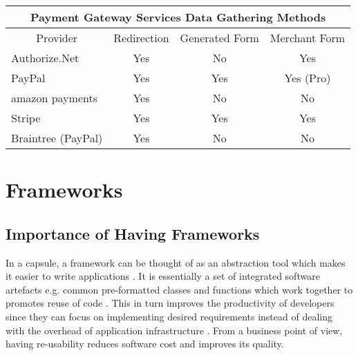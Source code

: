 \begin{center}
\begin{tabular}{ |p{3.5cm}|p{1.75cm}|p{2cm}|p{2cm}|  }
 \hline
 	\multicolumn{4}{|c|}{Payment Gateway Services Data Gathering Methods} \\
 \hline
 	\multicolumn{1}{|c|}{Provider} &
 	\multicolumn{1}{|c|}{Redirection} &
 	\multicolumn{1}{|c|}{Generated Form} &
 	\multicolumn{1}{|c|}{Merchant Form}  \\
 \hline
 	Authorize.Net\cite{authorize-net} & \multicolumn{1}{|c|}{Yes} & \multicolumn{1}{|c|}{No} & \multicolumn{1}{|c|}{Yes} \\
 \hline
 	PayPal\cite{paypal} & \multicolumn{1}{|c|}{Yes} & \multicolumn{1}{|c|}{Yes} & \multicolumn{1}{|c|}{Yes (Pro)} \\
 \hline
 	amazon payments\cite{amazon-payments} & \multicolumn{1}{|c|}{Yes} & \multicolumn{1}{|c|}{No} & \multicolumn{1}{|c|}{No} \\
 \hline
    Stripe\cite{stripe} & \multicolumn{1}{|c|}{Yes} & \multicolumn{1}{|c|}{Yes} & \multicolumn{1}{|c|}{Yes} \\
 \hline
 	Braintree (PayPal)\cite{braintree} & \multicolumn{1}{|c|}{Yes} & \multicolumn{1}{|c|}{No} & \multicolumn{1}{|c|}{No} \\
 \hline
\end{tabular}
\label{tab:gateway-providers}
\vspace{0.4cm}
\end{center}

\section{Frameworks}
\label{sec:frameworks}

\subsection{Importance of Having Frameworks}
\label{subsec:importance-of-having-frameworks}

In a capsule, a framework can be thought of as an abstraction tool which makes it easier to write applications \cite{1stwebdesigner}. It is essentially a set of integrated software artefacts e.g. common pre-formatted classes and functions which work together to promotes reuse of code \cite{framework-report-vamderbilt}. This in turn improves the productivity of developers since they can focus on implementing desired requirements instead of dealing with the overhead of application infrastructure \cite{cimetrix}. From a business point of view, having re-usability reduces software cost and improves its quality. 

